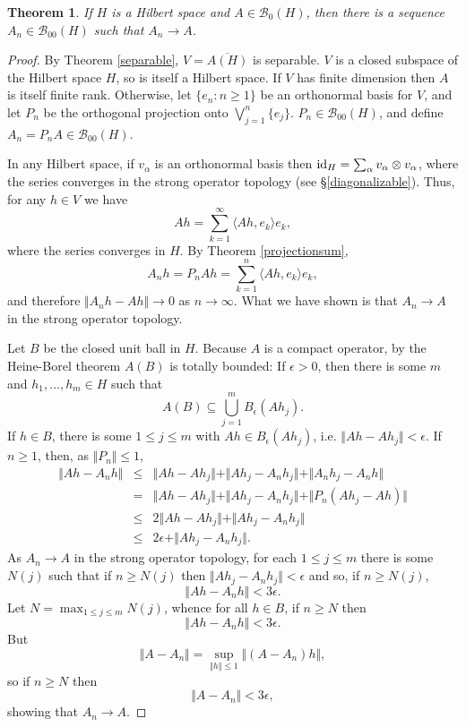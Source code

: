 \documentclass{article}
\newcommand{\inner}[2]{\langle #1, #2 \rangle}
\newcommand{\id}{\ensuremath\mathrm{id}}
\newcommand{\norm}[1]{\Vert #1 \Vert}
\newtheorem{theorem}{Theorem}
\begin{document}
\begin{theorem}
If $H$ is a Hilbert space and $A \in \mathscr{B}_0(H)$, then there is a sequence $A_n \in \mathscr{B}_{00}(H)$ such that $A_n \to A$.
\label{finiteranklimit}
\end{theorem}
\begin{proof}
By Theorem \ref{separable}, $V=\overline{A(H)}$ is separable. $V$ is a closed subspace of the Hilbert space $H$, so is itself a Hilbert space. If $V$ has finite dimension
then $A$ is itself finite rank. Otherwise,
let $\{e_n: n \geq 1\}$ be an orthonormal basis for $V$, and let $P_n$ be the orthogonal projection onto $\bigvee_{j=1}^n \{e_j\}$. 
 $P_n \in \mathscr{B}_{00}(H)$, and define $A_n=P_nA \in \mathscr{B}_{00}(H)$. 


In any Hilbert space, if $v_\alpha$ is an orthonormal basis then $\id_H = \sum_{\alpha} v_\alpha \otimes v_\alpha$, where the series converges in the strong operator
topology (see \S \ref{diagonalizable}). Thus, for any $h \in V$ we have
\[
Ah = \sum_{k=1}^\infty \inner{Ah}{e_k}e_k,
\]
where the series converges in $H$. By Theorem \ref{projectionsum},
\[
A_n h = P_nAh = \sum_{k=1}^n \inner{Ah}{e_k}e_k, 
\]
and therefore $\norm{A_n h -Ah} \to 0$ as $n \to \infty$. What we have shown is that $A_n \to A$ in the strong operator topology.

Let $B$ be the closed unit ball in $H$.
Because $A$ is a compact operator, by the Heine-Borel theorem $A(B)$ is totally bounded:  If $\epsilon>0$, then
  there is some $m$ and $h_1,\ldots,h_m \in
H$ such that
\[
A(B) \subseteq \bigcup_{j=1}^m B_{\epsilon}(Ah_j).
\]
If $h \in B$, there is some $1 \leq j \leq m$ with $Ah \in B_\epsilon(Ah_j)$, i.e. $\norm{Ah-Ah_j}<\epsilon$. If $n \geq 1$, then, as
$\norm{P_n} \leq 1$,
\begin{eqnarray*}
\norm{Ah-A_nh}&\leq&\norm{Ah-Ah_j}+\norm{Ah_j-A_nh_j}+\norm{A_nh_j-A_nh}\\
&=&\norm{Ah-Ah_j}+\norm{Ah_j-A_nh_j}+\norm{P_n(Ah_j-Ah)}\\
&\leq&2\norm{Ah-Ah_j}+\norm{Ah_j-A_nh_j}\\
&\leq&2\epsilon+\norm{Ah_j-A_nh_j}.
\end{eqnarray*}
As $A_n \to A$ in the strong operator topology, for each $1 \leq j \leq m$ there is some $N(j)$ such that if $n \geq N(j)$ then
$\norm{Ah_j-A_nh_j}<\epsilon$ and so, if $n \geq N(j)$,
\[
\norm{Ah-A_nh}<3\epsilon.
\]
Let $N=\max_{1 \leq j \leq m} N(j)$, whence for all $h \in B$, if $n \geq N$ then
\[
\norm{Ah-A_nh}<3\epsilon.
\]
But
\[
\norm{A-A_n}=\sup_{\norm{h} \leq 1} \norm{(A-A_n)h},
\]
so if $n \geq N$ then
\[
\norm{A-A_n} < 3\epsilon,
\]
showing that $A_n \to A$.
\end{proof}
\end{document}
